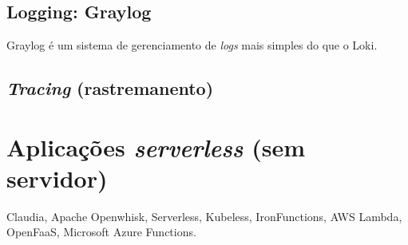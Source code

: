 \subsection{Logging: Graylog}
  Graylog é um sistema de gerenciamento de \emph{logs} mais simples do que o Loki.

\subsection{\emph{Tracing} (rastremanento)}
  







\section{Aplicações \emph{serverless} (sem servidor)}
  Claudia, Apache Openwhisk, Serverless, Kubeless, IronFunctions, AWS Lambda, OpenFaaS, Microsoft Azure Functions.


